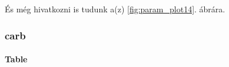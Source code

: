 \documentclass[]{elsarticle} %
\begin{document}
És még hivatkozni is tudunk a(z) \ref{fig:param_plot14}. ábrára.

\hypertarget{carb}{%
\subsubsection{carb}\label{carb}}

\hypertarget{table-2}{%
\paragraph{Table}\label{table-2}}

 
  \providecommand{\huxb}[2]{\arrayrulecolor[RGB]{#1}\global\arrayrulewidth=#2pt}
  \providecommand{\huxvb}[2]{\color[RGB]{#1}\vrule width #2pt}
  \providecommand{\huxtpad}[1]{\rule{0pt}{#1}}
  \providecommand{\huxbpad}[1]{\rule[-#1]{0pt}{#1}}
\end{document}
